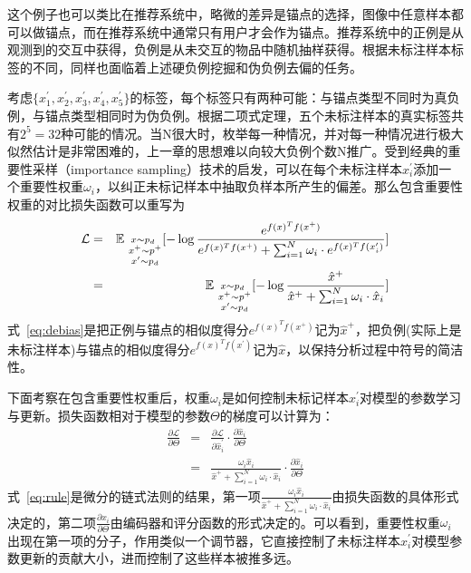 这个例子也可以类比在推荐系统中，略微的差异是锚点的选择，图像中任意样本都可以做锚点，而在推荐系统中通常只有用户才会作为锚点。推荐系统中的正例是从观测到的交互中获得，负例是从未交互的物品中随机抽样获得。根据未标注样本标签的不同，同样也面临着上述硬负例挖掘和伪负例去偏的任务。

考虑$\{x_1^\prime,x_2^\prime,x_3^\prime,x_4^\prime,x_5^\prime\}$的标签，每个标签只有两种可能：与锚点类型不同时为真负例，与锚点类型相同时为伪负例。根据二项式定理，五个未标注样本的真实标签共有$2^5=32$种可能的情况。当N很大时，枚举每一种情况，并对每一种情况进行极大似然估计是非常困难的，上一章的思想难以向较大负例个数N推广。受到经典的重要性采样（importance sampling）技术的启发，可以在每个未标注样本$x_i^\prime$添加一个重要性权重$\omega_i$，以纠正未标记样本中抽取负样本所产生的偏差。那么包含重要性权重的对比损失函数可以重写为
\begin{eqnarray}
	\small
	\mathcal{L} &=& \mathbb E_{ \substack{x \sim p_d\\~x^+ \sim p^+\\{~x^\prime \sim p_d}}}
	[-\log \frac{e^{f(x)^Tf(x^+)}}{e^{f(x)^Tf(x^+)} + \sum_{i=1}^{N} \omega_i \cdot e^{f(x)^Tf(x_i^\prime)}}] \nonumber \\
	&=& \mathbb E_{ \substack{x \sim p_d\\~x^+ \sim p^+\\{~x^\prime \sim p_d}}}
	[-\log \frac{\hat{x}^+}{{\hat{x}^+} + \sum_{i=1}^{N} \omega_i \cdot \hat{x}_i}] \label{eq:debias}
\end{eqnarray}
式~\eqref{eq:debias}是把正例与锚点的相似度得分$e^{f(x)^Tf(x^+)}$记为$\hat{x}^+$，把负例(实际上是未标注样本)与锚点的相似度得分$e^{f(x)^Tf(x^\prime)}$记为$\hat{x}$，以保持分析过程中符号的简洁性。
		
下面考察在包含重要性权重后，权重$\omega_i$是如何控制未标记样本$x^\prime_i$对模型的参数学习与更新。损失函数相对于模型的参数$\Theta$的梯度可以计算为：
\begin{eqnarray}
\frac{\partial\mathcal{L}}{\partial \Theta} &=& \frac{\partial\mathcal{L}}{\partial \hat{x}_i^\prime} \cdot \frac{\partial \hat{x}_i}{\partial\Theta} \\
&=&  \frac{ \omega_i\hat{x}_i} {\hat{x}^+ + \sum_{i=1}^{N} \omega_i \cdot \hat{x}_i}\cdot \frac{\partial \hat{x}_i}{\partial\Theta} \label{eq:rule}
\end{eqnarray}
式~\eqref{eq:rule}是微分的链式法则的结果，第一项$\frac{ \omega_i\hat{x}_i} {\hat{x}^+ + \sum_{i=1}^{N} \omega_i \cdot \hat{x}_i}$由损失函数的具体形式决定的，第二项$ \frac{\partial \hat{x}_i}{\partial\Theta}$由编码器和评分函数的形式决定的。可以看到，重要性权重$\omega_i$出现在第一项的分子，作用类似一个调节器，它直接控制了未标注样本$x_i^\prime$对模型参数更新的贡献大小，进而控制了这些样本被推多远。

